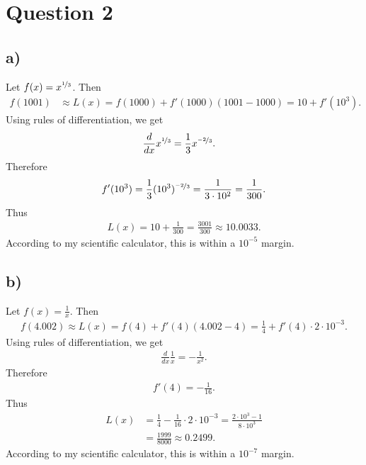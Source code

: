 \documentclass{article}
\begin{document}
\section*{Question 2}
\subsection*{a)}
Let $f(x)=x^{\nicefrac{1}{3}}$. Then
\begin{align*}
  f(1001)&\approx L(x)= f(1000)+f'(1000)(1001-1000)=10+f'(10^3).
\end{align*}
Using rules of differentiation, we get
\begin{align*}
  \frac{d}{dx}x^{\nicefrac{1}{3}}&=\frac{1}{3}x^{\nicefrac{-2}{3}}.
\end{align*}
Therefore
\begin{align*}
  f'(10^3)=\frac{1}{3}(10^3)^{\nicefrac{-2}{3}}=\frac{1}{3\cdot10^2}=\frac{1}{300}.
\end{align*}
Thus
\begin{align*}
  L(x)=10+\frac{1}{300}=\frac{3001}{300}\approx10.0033.
\end{align*}
According to my scientific calculator, this is within a $10^{-5}$ margin.
\subsection*{b)}
Let $f(x)=\frac{1}{x}$. Then
\begin{align*}
  f(4.002)\approx L(x)=f(4)+f'(4)(4.002-4)=\frac{1}{4}+f'(4)\cdot2\cdot10^{-3}.
\end{align*}
Using rules of differentiation, we get
\begin{align*}
  \frac{d}{dx}\frac{1}{x}=-\frac{1}{x^2}.
\end{align*}
Therefore
\begin{align*}
  f'(4)=-\frac{1}{16}.
\end{align*}
Thus
\begin{align*}
  L(x)&=\frac{1}{4}-\frac{1}{16}\cdot 2\cdot 10^{-3}=\frac{2\cdot 10^3-1}{8\cdot10^3}\\
  &=\frac{1999}{8000}\approx0.2499.
\end{align*}
According to my scientific calculator, this is within a $10^{-7}$ margin.
\end{document}
